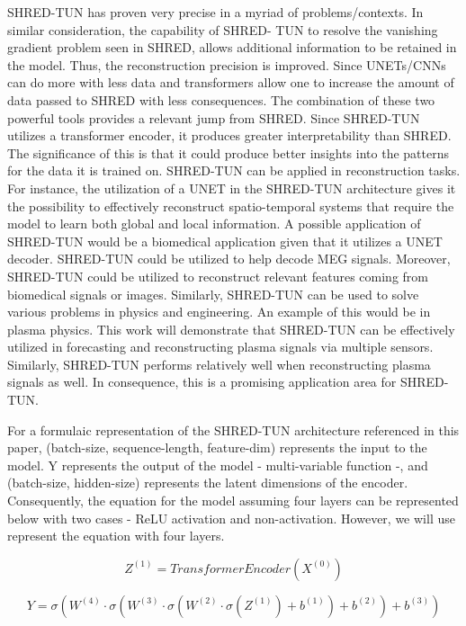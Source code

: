 \documentclass[11pt, a4paper]{article}
\begin{document}
SHRED-TUN has
proven very precise in a myriad of problems/contexts. In similar consideration, the capability of SHRED-
TUN to resolve the vanishing gradient problem seen in SHRED, allows additional information to be retained
in the model. Thus, the reconstruction precision is improved. Since UNETs/CNNs can do more with less
data and transformers allow one to increase the amount of data passed to SHRED with less consequences.
The combination of these two powerful tools provides a relevant jump from SHRED. Since SHRED-TUN
utilizes a transformer encoder, it produces greater interpretability than SHRED. The significance of this is
that it could produce better insights into the patterns for the data it is trained on.
SHRED-TUN can be applied in reconstruction tasks. For instance, the utilization of a UNET in the
SHRED-TUN architecture gives it the possibility to effectively reconstruct spatio-temporal systems that
require the model to learn both global and local information. A possible application of SHRED-TUN would
be a biomedical application given that it utilizes a UNET decoder. SHRED-TUN could be utilized to help
decode MEG signals. Moreover, SHRED-TUN could be utilized to reconstruct relevant features coming from
biomedical signals or images.
Similarly, SHRED-TUN can be used to solve various problems in physics and engineering. An example of
this would be in plasma physics. This work will demonstrate that SHRED-TUN can be effectively utilized
in forecasting and reconstructing plasma signals via multiple sensors. Similarly, SHRED-TUN performs
relatively well when reconstructing plasma signals as well. In consequence, this is a promising application
area for SHRED-TUN. 

For a formulaic representation of the SHRED-TUN architecture referenced in this paper,   (batch-size, sequence-length, feature-dim) represents the input to the model. Y represents the output of the model - multi-variable function -, and  (batch-size, hidden-size) represents the latent dimensions of the encoder. Consequently, the equation for the model assuming four layers can be represented below with two cases - ReLU activation and non-activation. However, we will use represent the equation with four layers. 

\begin{equation}
    Z^{(1)} = TransformerEncoder(X^{(0)})
\end{equation}


\begin{equation}
    Y = \sigma\left(W^{(4)} \cdot \sigma\left(W^{(3)} \cdot \sigma\left(W^{(2)} \cdot \sigma(Z^{(1)}) + b^{(1)}\right) + b^{(2)}\right) + b^{(3)}\right)
\end{equation}
\end{document}

